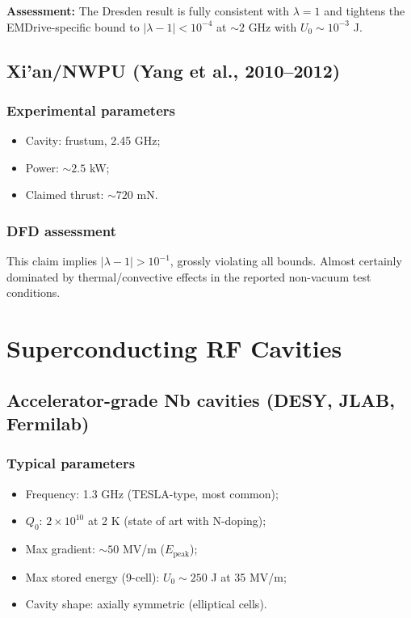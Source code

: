 \documentclass[12pt,letterpaper]{article}
\begin{document}
\textbf{Assessment:} The Dresden result is fully consistent with
$\lambda = 1$ and tightens the EMDrive-specific bound to
$|\lambda - 1| < 10^{-4}$ at $\sim 2$ GHz with $U_0 \sim 10^{-3}$ J.

\subsection{Xi'an/NWPU (Yang et al., 2010--2012)}

\subsubsection{Experimental parameters}
\begin{itemize}[noitemsep]
  \item Cavity: frustum, 2.45 GHz;
  \item Power: $\sim 2.5$ kW;
  \item Claimed thrust: $\sim 720$ mN.
\end{itemize}

\subsubsection{DFD assessment}

This claim implies $|\lambda - 1| > 10^{-1}$, grossly violating all
bounds.  Almost certainly dominated by thermal/convective effects in
the reported non-vacuum test conditions.

\section{Superconducting RF Cavities}

\subsection{Accelerator-grade Nb cavities (DESY, JLAB, Fermilab)}

\subsubsection{Typical parameters}
\begin{itemize}[noitemsep]
  \item Frequency: 1.3 GHz (TESLA-type, most common);
  \item $Q_0$: $2\times 10^{10}$ at 2 K (state of art with N-doping);
  \item Max gradient: $\sim 50$ MV/m ($E_{\text{peak}}$);
  \item Max stored energy (9-cell): $U_0 \sim 250$ J at 35 MV/m;
  \item Cavity shape: axially symmetric (elliptical cells).
\end{itemize}
\end{document}
